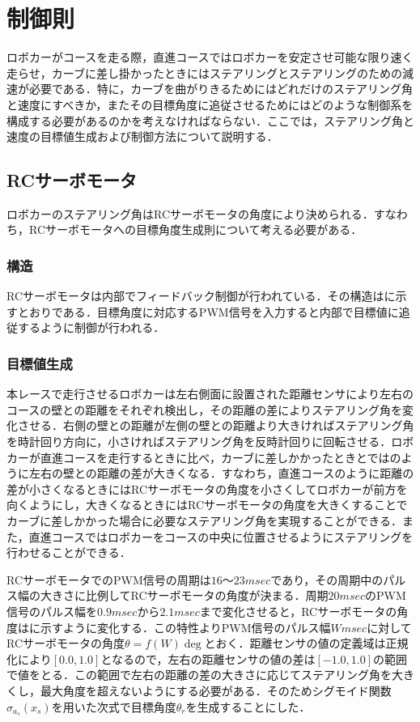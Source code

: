 \section{制御則}
ロボカーがコースを走る際，直進コースではロボカーを安定させ可能な限り速く走らせ，カーブに差し掛かったときにはステアリングとステアリングのための減速が必要である．特に，カーブを曲がりきるためにはどれだけのステアリング角と速度にすべきか，またその目標角度に追従させるためにはどのような制御系を構成する必要があるのかを考えなければならない．ここでは，ステアリング角と速度の目標値生成および制御方法について説明する．
 
 
\subsection{RCサーボモータ}
ロボカーのステアリング角はRCサーボモータの角度により決められる．すなわち，RCサーボモータへの目標角度生成則について考える必要がある．
  
\subsubsection{構造}
RCサーボモータは内部でフィードバック制御が行われている．その構造はに示すとおりである\cite{RCservo}．目標角度に対応するPWM信号を入力すると内部で目標値に追従するように制御が行われる．

\subsubsection{目標値生成}
  本レースで走行させるロボカーは左右側面に設置された距離センサにより左右のコースの壁との距離をそれぞれ検出し，その距離の差によりステアリング角を変化させる．右側の壁との距離が左側の壁との距離より大きければステアリング角を時計回り方向に，小さければステアリング角を反時計回りに回転させる．ロボカーが直進コースを走行するときに比べ，カーブに差しかかったときとではのように左右の壁との距離の差が大きくなる．すなわち，直進コースのように距離の差が小さくなるときにはRCサーボモータの角度を小さくしてロボカーが前方を向くようにし，大きくなるときにはRCサーボモータの角度を大きくすることでカーブに差しかかった場合に必要なステアリング角を実現することができる．また，直進コースではロボカーをコースの中央に位置させるようにステアリングを行わせることができる．
  
RCサーボモータでのPWM信号の周期は$16〜23\unit{msec}$であり，その周期中のパルス幅の大きさに比例してRCサーボモータの角度が決まる．周期$20\unit{msec}$のPWM信号のパルス幅を$0.9\unit{msec}$から$2.1\unit{msec}$まで変化させると，RCサーボモータの角度はに示すように変化する．この特性よりPWM信号のパルス幅$W\unit{msec}$に対してRCサーボモータの角度$\theta=f(W)\unit{\deg}$とおく．距離センサの値の定義域は正規化により$[0.0,1.0]$となるので，左右の距離センサの値の差は$[-1.0,1.0]$の範囲で値をとる．この範囲で左右の距離の差の大きさに応じてステアリング角を大きくし，最大角度を超えないようにする必要がある．そのためシグモイド関数$\sigma_{a_{s}}(x_{s}) $を用いた次式で目標角度$\theta_{r} $を生成することにした．

